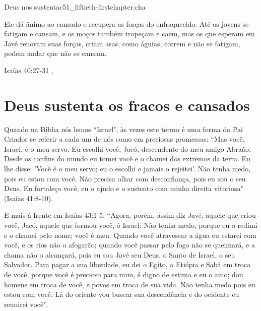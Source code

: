 \begin{chapterpage}{Deus nos sustenta}{c51_fiftieth-firstchapter:cha}
 
\begin{myquotation}Ele dá ânimo ao cansado e recupera as forças do enfraquecido. Até os jovens se fatigam e cansam, e os moços também tropeçam e caem, mas os que esperam em Javé renovam suas forças, criam asas, como águias, correm e não se fatigam, podem andar que não se cansam.
\par\vspace*{15mm}
\mbox{}\hfill \emdash{}Isaías 40:27-31
, %
\par\end{myquotation}

\end{chapterpage}



\section{Deus sustenta os fracos e cansados}\label{c1_basicformatting:sec}

\emdash{}Quando na Bíblia nós lemos ``Israel", às vezes este termo é uma forma do Pai Criador se referir a cada um de nós como em preciosas promessas: ``Mas você, Israel, é o meu servo. Eu escolhi você, Jacó, descendente do meu amigo Abraão. Desde os confins do mundo eu tomei você e o chamei dos extremos da terra. Eu lhe disse: 'Você é o meu servo; eu o escolhi e jamais o rejeitei'. Não tenha medo, pois eu estou com você. Não precisa olhar com desconfiança, pois eu sou o seu Deus. Eu fortaleço você, eu o ajudo e o sustento com minha direita vitoriosa"(Isaías 41:8-10).

\emdash{}E mais à frente em Isaías 43:1-5, ``Agora, porém, assim diz Javé, aquele que criou você, Jacó, aquele que formou você, ó Israel: Não tenha medo, porque eu o redimi e o chamei pelo nome; você é meu. Quando você atravessar a água eu estarei com você, e os rios não o afogarão; quando você passar pelo fogo não se queimará, e a chama não o alcançará, pois eu sou Javé seu Deus, o Santo de Israel, o seu Salvador. Para pagar a sua liberdade, eu dei o Egito, a Etiópia e Sabá em troca de você, porque você é precioso para mim, é digno de estima e eu o amo; dou homens em troca de você, e povos em troca de sua vida. Não tenha medo pois eu estou com você. Lá do oriente vou buscar sua descendência e do ocidente eu reunirei você".

